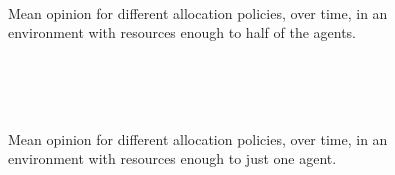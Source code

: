 \documentclass[conference,compsoc]{IEEEtran}
\begin{document}


%
%
%







\appendix[Figures]

\begin{figure}
    \centering
    \\
    \\
    \\
    \caption{Mean opinion for different allocation policies, over time, in an environment with resources enough to half of the agents.}
    \label{Exp1_half}
\end{figure}



\begin{figure}
    \centering
    \\
    \\
    \\
    \caption{Mean opinion for different allocation policies, over time, in an environment with resources enough to just one agent.}
    \label{Exp1_single}
\end{figure}
\end{document}
